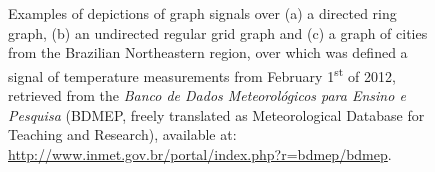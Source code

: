 \begin{figure}
	\centering
	\caption{Examples of depictions of graph signals over (a) a directed ring graph, 
		(b) an undirected regular grid graph and (c) a graph of cities from the Brazilian Northeastern region, over which was defined a signal of temperature measurements from February 1\textsuperscript{st} of 2012, retrieved from the
		\emph{Banco de Dados Meteorol\'ogicos para Ensino e Pesquisa} (BDMEP, freely translated as Meteorological Database for Teaching and Research), available at: \url{http://www.inmet.gov.br/portal/index.php?r=bdmep/bdmep}.}%
	\label{fig:graphs}%
	\vspace{-0.2cm}
\end{figure}


